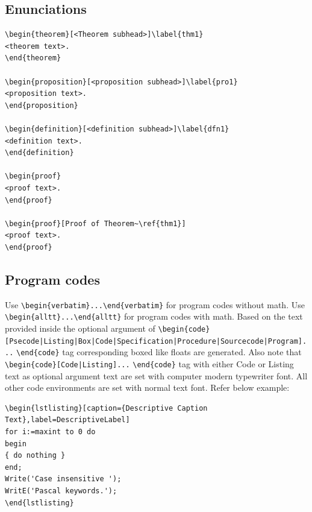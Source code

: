 \documentclass[AMA,STIX1COL]{WileyNJD-v2}
\begin{document}
\subsection{Enunciations}

\begin{verbatim}
\begin{theorem}[<Theorem subhead>]\label{thm1}
<theorem text>. 
\end{theorem}

\begin{proposition}[<proposition subhead>]\label{pro1}
<proposition text>. 
\end{proposition}

\begin{definition}[<definition subhead>]\label{dfn1}
<definition text>. 
\end{definition}

\begin{proof}
<proof text>. 
\end{proof}

\begin{proof}[Proof of Theorem~\ref{thm1}]
<proof text>.
\end{proof}

\end{verbatim}

\subsection{Program codes}

Use \verb+\begin{verbatim}...\end{verbatim}+ for program codes without math. Use \verb+\begin{alltt}...\end{alltt}+ for program codes with math. Based on the text provided inside the optional argument of \verb+\begin{code}[Psecode|Listing|Box|Code|+\hfill\break \verb+Specification|Procedure|Sourcecode|Program]...+ \verb+\end{code}+ tag corresponding boxed like floats are generated. Also note that \verb+\begin{code}[Code|Listing]...+ \verb+\end{code}+ tag with either Code or Listing text as optional argument text are set with computer modern typewriter font.  All other code environments are set with normal text font. Refer below example:

\begin{verbatim}
\begin{lstlisting}[caption={Descriptive Caption Text},label=DescriptiveLabel]
for i:=maxint to 0 do
begin
{ do nothing }
end;
Write('Case insensitive ');
WritE('Pascal keywords.');
\end{lstlisting}
\end{verbatim}
\end{document}
